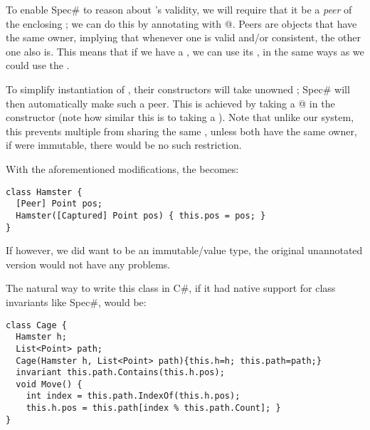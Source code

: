 To enable Spec\# to reason about \Q@pos@'s validity, we will require that it be a \emph{peer} of the enclosing \Q@Hamster@; we can do this by annotating \Q@pos@ with \Q@[Peer]@. Peers are objects that have the same owner, implying that  whenever one is valid and/or consistent, the other one also is. This means that if we have a \Q@Hamster@, we can use its \Q@pos@, in the same ways as we could use the \Q@Hamster@.

To simplify instantiation of \Q@Hamster@s, their constructors will take unowned \Q@Point@s; Spec\# will then automatically make such \Q@Point@ a peer. This is achieved by taking a \Q@[Captured]@ \Q@Point@ in the constructor (note how similar this is to taking a \Q@capsule@ \Q@Point@). Note that unlike our system, this prevents multiple \Q@Hamster@s from sharing the same \Q@Point@, unless both \Q@Hamster@s have the same owner, if \Q@Point@ were immutable, there would be no such restriction.

With the aforementioned modifications, the \Q@Hamster@ becomes:
\begin{lstlisting}
class Hamster {
  [Peer] Point pos;
  Hamster([Captured] Point pos) { this.pos = pos; }
}
\end{lstlisting}

If however, we did want \Q@Point@ to be an immutable/value type, the original unannotated version would not have any problems.

The natural way to write this class in C\#, if it had native support for class invariants like Spec\#, would be:
\begin{lstlisting}
class Cage {
  Hamster h;
  List<Point> path;
  Cage(Hamster h, List<Point> path){this.h=h; this.path=path;}
  invariant this.path.Contains(this.h.pos);
  void Move() { 
    int index = this.path.IndexOf(this.h.pos);
    this.h.pos = this.path[index % this.path.Count]; } 
}
\end{lstlisting}

